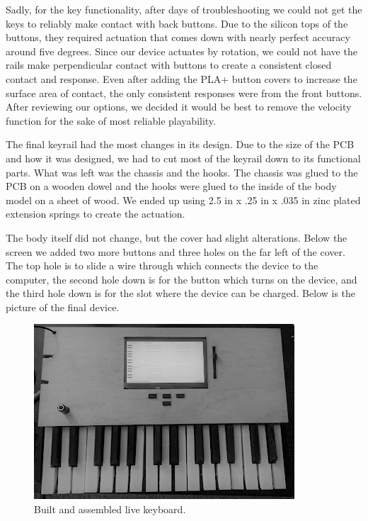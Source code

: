 Sadly, for the key functionality, after days of troubleshooting we could not get the keys to reliably make contact with back buttons. Due to the silicon tops of the buttons, they required actuation that comes down with nearly perfect accuracy around five degrees. Since our device actuates by rotation, we could not have the rails make perpendicular contact with buttons to create a consistent closed contact and response. Even after adding the PLA+ button covers to increase the surface area of contact, the only consistent responses were from the front buttons. After reviewing our options, we decided it would be best to remove the velocity function for the sake of most reliable playability.

The final keyrail had the most changes in its design. Due to the size of the PCB and how it was designed, we had to cut most of the keyrail down to its functional parts. What was left was the chassis and the hooks. The chassis was glued to the PCB on a wooden dowel and the hooks were glued to the inside of the body model on a sheet of wood. We ended up using 2.5 in x .25 in x .035 in zinc plated extension springs to create the actuation.

The body itself did not change, but the cover had slight alterations. Below the screen we added two more buttons and three holes on the far left of the cover. The top hole is to slide a wire through which connects the device to the computer, the second hole down is for the button which turns on the device, and the third hole down is for the slot where the device can be charged. Below is the picture of the final device.

\begin{figure}[h!]
  \centering
  \includegraphics[width=0.8\linewidth]{image/Keyboard_Photo.jpg}
  \caption{Built and assembled live keyboard.}
  \label{fig:keyboard_photo}
\end{figure}

